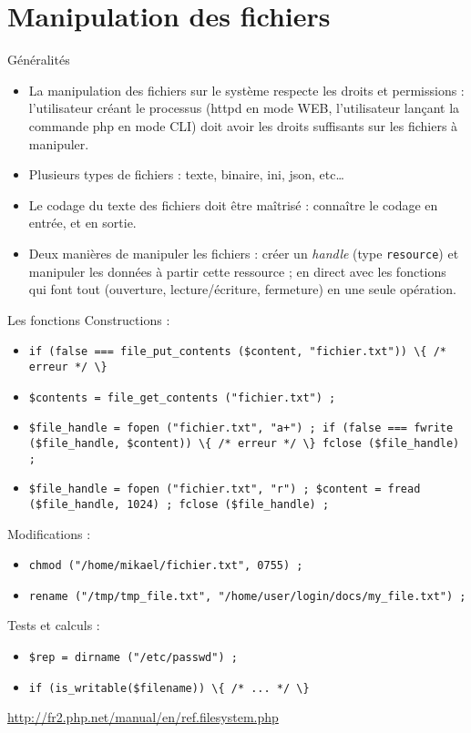 
\section{Manipulation des fichiers}

\begin{frame}{Généralités}
	\begin{itemize} 
		\item La manipulation des fichiers sur le système respecte les droits et permissions : l’utilisateur créant le processus (httpd en mode WEB, l’utilisateur lançant la commande php en mode CLI) doit avoir les droits suffisants sur les fichiers à manipuler.
		\item Plusieurs types de fichiers : texte, binaire, ini, json, etc\ldots
		\item Le codage du texte des fichiers doit être maîtrisé : connaître le codage en entrée, et en sortie.
		\item Deux manières de manipuler les fichiers : créer un \textit{handle} (type \texttt{resource}) et manipuler les données à partir cette ressource ; en direct avec les fonctions qui font tout (ouverture, lecture/écriture, fermeture) en une seule opération.
	\end{itemize}
\end{frame}


\begin{frame}{Les fonctions}
	Constructions :
	\begin{itemize}
		\item \lstinline~if (false === file_put_contents ($content, "fichier.txt")) \{ /* erreur */ \}~
		\item \lstinline~$contents = file_get_contents ("fichier.txt") ;~
		\item \lstinline~$file_handle = fopen ("fichier.txt", "a+") ; if (false === fwrite ($file_handle, $content)) \{ /* erreur */ \} fclose ($file_handle) ;~
		\item \lstinline~$file_handle = fopen ("fichier.txt", "r") ; $content = fread ($file_handle, 1024) ; fclose ($file_handle) ;~
	\end{itemize}
	Modifications :
	\begin{itemize}
		\item \lstinline~chmod ("/home/mikael/fichier.txt", 0755) ;~
		\item \lstinline~rename ("/tmp/tmp_file.txt", "/home/user/login/docs/my_file.txt") ;~
	\end{itemize}
	Tests et calculs :
	\begin{itemize}
		\item \lstinline~$rep = dirname ("/etc/passwd") ;~
		\item \lstinline~if (is_writable($filename)) \{ /* ... */ \}~
	\end{itemize}
	\url{http://fr2.php.net/manual/en/ref.filesystem.php}\\
\end{frame}
 
 